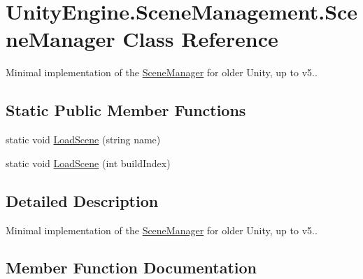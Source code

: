 \hypertarget{class_unity_engine_1_1_scene_management_1_1_scene_manager}{}\section{Unity\+Engine.\+Scene\+Management.\+Scene\+Manager Class Reference}
\label{class_unity_engine_1_1_scene_management_1_1_scene_manager}


Minimal implementation of the \hyperlink{class_unity_engine_1_1_scene_management_1_1_scene_manager}{Scene\+Manager} for older Unity, up to v5.. 


\subsection*{Static Public Member Functions}
\begin{DoxyCompactItemize}
\item 
static void \hyperlink{class_unity_engine_1_1_scene_management_1_1_scene_manager_a44f218a648b456714c451e119db53b2b}{Load\+Scene} (string name)
\item 
static void \hyperlink{class_unity_engine_1_1_scene_management_1_1_scene_manager_a87166a3e05d57edf58bc6e71d0cf75d5}{Load\+Scene} (int build\+Index)
\end{DoxyCompactItemize}


\subsection{Detailed Description}
Minimal implementation of the \hyperlink{class_unity_engine_1_1_scene_management_1_1_scene_manager}{Scene\+Manager} for older Unity, up to v5..



\subsection{Member Function Documentation}
